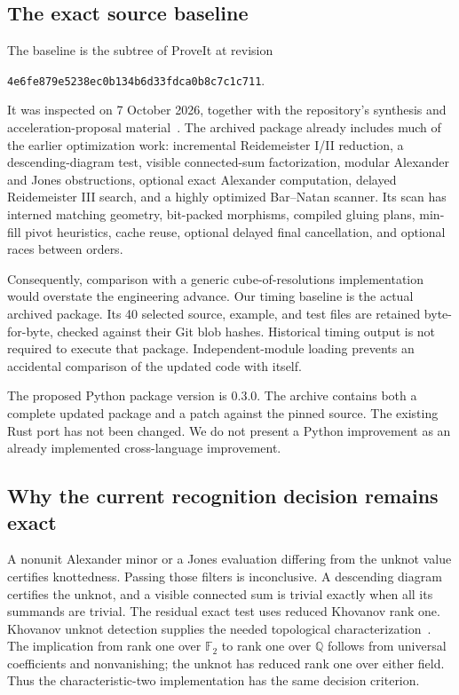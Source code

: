 \documentclass[11pt,a4paper]{article}
\theoremstyle{definition}
\theoremstyle{remark}
\newcommand{\F}{\mathbb{F}_2}
\begin{document}
\subsection{The exact source baseline}

The baseline is the  subtree of
ProveIt at revision
\begin{center}\small
\texttt{4e6fe879e5238ec0b134b6d33fdca0b8c7c1c711}.
\end{center}
It was inspected on 7 October 2026, together with the repository's synthesis
and acceleration-proposal material~\cite{repository}.  The archived package
already includes much of the earlier optimization work: incremental
Reidemeister I/II reduction, a descending-diagram test, visible connected-sum
factorization, modular Alexander and Jones obstructions, optional exact
Alexander computation, delayed Reidemeister III search, and a highly optimized
Bar--Natan scanner.  Its scan has interned matching geometry, bit-packed
morphisms, compiled gluing plans, min-fill pivot heuristics, cache reuse,
optional delayed final cancellation, and optional races between orders.

Consequently, comparison with a generic cube-of-resolutions implementation
would overstate the engineering advance.  Our timing baseline is the actual
archived package.  Its 40 selected source, example, and test files are retained
byte-for-byte, checked against their Git blob hashes.  Historical timing output
is not required to execute that package.  Independent-module loading prevents
an accidental comparison of the updated code with itself.

The proposed Python package version is 0.3.0.  The archive contains both a
complete updated package and a patch against the pinned source.  The existing
Rust port has not been changed.  We do not present a Python improvement as an
already implemented cross-language improvement.

\subsection{Why the current recognition decision remains exact}

A nonunit Alexander minor or a Jones evaluation differing from the unknot
value certifies knottedness.  Passing those filters is inconclusive.  A
descending diagram certifies the unknot, and a visible connected sum is trivial
exactly when all its summands are trivial.  The residual exact test uses
reduced Khovanov rank one.  Khovanov unknot detection supplies the needed
topological characterization~\cite{kronheimermrowka}.  The implication from
rank one over $\F$ to rank one over $\mathbb Q$ follows from universal
coefficients and nonvanishing; the unknot has reduced rank one over either
field.  Thus the characteristic-two implementation has the same decision
criterion.
\end{document}
